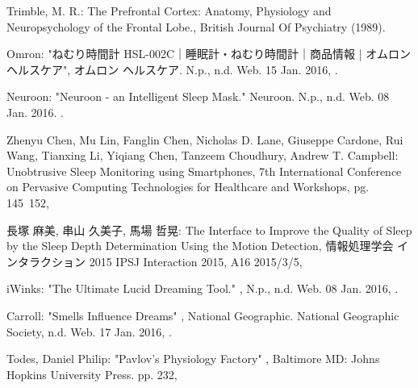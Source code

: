 \begin{bib}[100]
\begin{flushleft}
  Trimble, M. R.:
  \newblock The Prefrontal Cortex: Anatomy, Physiology and Neuropsychology of the Frontal Lobe.,
  \newblock  British Journal Of Psychiatry (1989).
\end{flushleft}

\begin{flushleft}
  Omron:
  \newblock  "ねむり時間計 HSL-002C｜睡眠計・ねむり時間計｜商品情報 | オムロン ヘルスケア",
  \newblock オムロン ヘルスケア. N.p., n.d. Web. 15 Jan. 2016,
  .
\end{flushleft}

\begin{flushleft}
  Neuroon:
  \newblock  "Neuroon - an Intelligent Sleep Mask."
  \newblock Neuroon. N.p., n.d. Web. 08 Jan. 2016.
  .
\end{flushleft}

\begin{flushleft}
  Zhenyu Chen, Mu Lin, Fanglin Chen, Nicholas D. Lane, Giuseppe Cardone, Rui Wang, Tianxing Li, Yiqiang Chen, Tanzeem Choudhury, Andrew T. Campbell:
  \newblock  Unobtrusive Sleep Monitoring using Smartphones,
   7th International Conference on Pervasive Computing Technologies for Healthcare and Workshops, pg. 145~152,
\end{flushleft}

\begin{flushleft}
  長塚 麻美, 串山 久美子, 馬場 哲晃:
  \newblock  The Interface to Improve the Quality of Sleep by the Sleep Depth Determination Using the Motion Detection,
  \newblock 情報処理学会 インタラクション 2015 IPSJ Interaction 2015,
  \newblock  A16 2015/3/5,
\end{flushleft}

\begin{flushleft}
iWinks:
 \newblock  "The Ultimate Lucid Dreaming Tool." ,
  \newblock N.p., n.d. Web. 08 Jan. 2016,
  .
\end{flushleft}

\begin{flushleft}
Carroll:
 \newblock  "Smells Influence Dreams" ,
  \newblock National Geographic. National Geographic Society, n.d. Web. 17 Jan. 2016,
  .
\end{flushleft}

\begin{flushleft}
Todes, Daniel Philip:
 \newblock  "Pavlov's Physiology Factory" ,
  \newblock Baltimore MD: Johns Hopkins University Press. pp. 232,
\end{flushleft}

\end{bib}